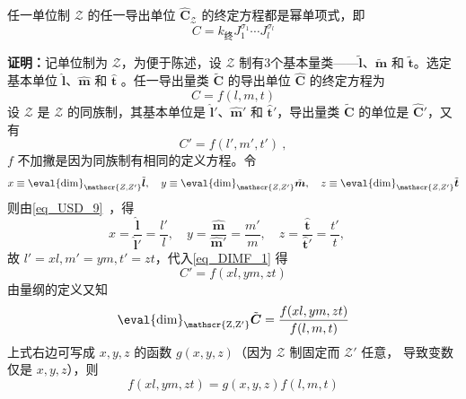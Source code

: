 \begin{theorem}{}\label{the_DIMF_2}
任一单位制 $\mathscr{Z}$ 的任一导出单位 $\hat{\boldsymbol{C}}_{ \mathscr{Z}}$ 的终定方程都是幂单项式，即
\begin{equation}\label{eq_DIMF_6}
C=k_{\text{终}}J_1^{\sigma_1}\cdots J_l^{\sigma_l}
\end{equation}
\end{theorem}
\textbf{证明：}记单位制为 $\mathscr{Z}$，为便于陈述，设 $\mathscr{Z}$ 制有3个基本量类——$\tilde{\boldsymbol{l}}$、$\tilde{\boldsymbol{m}}$ 和 $\tilde{\boldsymbol{t}}$。选定基本单位 $\hat{\boldsymbol{l}}$、$\hat{\boldsymbol{m}}$ 和 $\hat{\boldsymbol{t}}$ 。任一导出量类 $\tilde{\boldsymbol{C}}$ 的导出单位 $\hat{\boldsymbol{C}}$ 的终定方程为
\begin{equation}
C=f(l,m,t)
\end{equation}
设 $\mathscr{Z}$ 是 $\mathscr{Z}$ 的同族制，其基本单位是 $\hat{\boldsymbol{l}}'$、$\hat{\boldsymbol{m}}'$ 和 $\hat{\boldsymbol{t}}'$，导出量类 $\tilde{\boldsymbol{C}}$ 的单位是  $\hat{\boldsymbol{C}}'$，又有
\begin{equation}\label{eq_DIMF_1}
C'=f(l',m',t')~,
\end{equation}
$f$ 不加撇是因为同族制有相同的定义方程。令
\begin{equation}
x\equiv \eval{\mathrm{dim}}_{\mathscr{Z,Z'}}\tilde{\boldsymbol{l}},\quad y\equiv \eval{\mathrm{dim}}_{\mathscr{Z,Z'}}\tilde{\boldsymbol{m}},\quad z\equiv \eval{\mathrm{dim}}_{\mathscr{Z,Z'}}\tilde{\boldsymbol{t}}
\end{equation}
则由\autoref{eq_USD_9}~，得
\begin{equation}
x=\frac{\hat{\boldsymbol{l}}}{\hat{\boldsymbol{l}}'}=\frac{l'}{l},\quad y=\frac{\hat{\boldsymbol{m}}}{\hat{\boldsymbol{m}}'}=\frac{m'}{m},\quad z=\frac{\hat{\boldsymbol{t}}}{\hat{\boldsymbol{t}}'}=\frac{t'}{t},\quad 
\end{equation}
故 $l'=xl,m'=ym,t'=zt$，代入\autoref{eq_DIMF_1} 得
\begin{equation}
C'=f(xl,ym,zt)
\end{equation}
由量纲的定义又知
\begin{equation}
\mathrm{\eval{dim}_{\mathscr{Z,Z'
}}}\tilde{\boldsymbol{C}}=\frac{f(xl,ym,zt)}{f(l,m,t)}
\end{equation}
上式右边可写成 $x,y,z$ 的函数 $g(x,y,z)$（因为 $\mathcal{Z}$ 制固定而 $\mathscr{Z'}$ 任意， 导致变数仅是 $x,y,z$），则
\begin{equation}\label{eq_DIMF_2}
f(xl,ym,zt)=g(x,y,z)f(l,m,t)
\end{equation}
